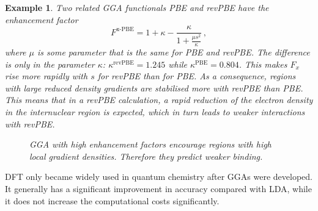\documentclass{article}
\theoremstyle{plain}\theoremheaderfont{\normalfont\itshape}\theorembodyfont{\rmfamily}\theoremseparator{.}\newtheorem*{rem}{Remark}\newtheorem*{ex}{Example}\newtheorem*{proof}{Proof}\newtheorem*{altp}{Alternative proof}
\theoremstyle{plain}\theoremheaderfont{\normalfont\bfseries}\theorembodyfont{\rmfamily}\theoremseparator{.}\newtheorem{thm}{Theorem}[section]\newtheorem{lem}[thm]{Lemma}\newtheorem{prop}[thm]{Proposition}\newtheorem*{cor}{Corollary}\newtheorem{defn}[thm]{Definition}\newtheorem{clm}[thm]{Claim}\newtheorem{clminproof}{Claim}\newtheorem{pos}{Postulate}[section]
\theoremstyle{break}\theoremheaderfont{\normalfont\itshape}\theorembodyfont{\rmfamily}\theoremseparator{.\medskip}\newtheorem*{proofskip}{Proof}\newtheorem*{exs}{Examples}\newtheorem*{rems}{Remarks}
\theoremstyle{break}\theoremheaderfont{\normalfont\bfseries}\theorembodyfont{\rmfamily}\theoremseparator{.\medskip}\newtheorem{lemskip}[thm]{Lemma}\newtheorem{defnskip}[thm]{Definition}\newtheorem{propskip}[thm]{Proposition}\newtheorem{thmskip}[thm]{Theorem}
\numberwithin{equation}{section}
\begin{document}
    \begin{ex}
        Two related GGA functionals PBE and revPBE have the enhancement factor
        \begin{equation}
            F^{\text{x-PBE}}=1+\kappa-\frac{\kappa}{1+\frac{\mu s^2}{\kappa}}\,,
        \end{equation}
        where \(\mu\) is some parameter that is the same for PBE and revPBE. The difference is only in the parameter \(\kappa\): \(\kappa^{\text{revPBE}}=1.245\) while \(\kappa^{\text{PBE}}=0.804\). This makes \(F_x\) rise more rapidly with \(s\) for revPBE than for PBE. As a consequence, regions with large reduced density gradients are stabilised more with revPBE than PBE. This means that in a revPBE calculation, a rapid reduction of the electron density in the internuclear region is expected, which in turn leads to weaker interactions with revPBE.
        \begin{figure}
            \centering
            \caption{GGA with high enhancement factors encourage regions with high local gradient densities. Therefore they predict weaker binding.}
        \end{figure}
    \end{ex}

    DFT only became widely used in quantum chemistry after GGAs were developed. It generally has a significant improvement in accuracy compared with LDA, while it does not increase the computational costs significantly.
\end{document}
